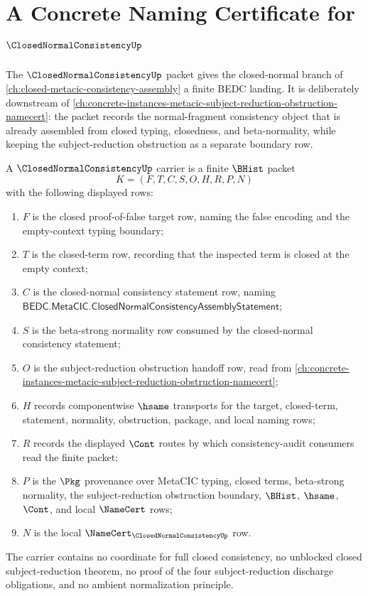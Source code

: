 \chapter{A Concrete Naming Certificate for $\ClosedNormalConsistencyUp$}
\label{ch:concrete-instances-closed-normal-consistency-namecert}

The $\ClosedNormalConsistencyUp$ packet gives the closed-normal branch of
\autoref{ch:closed-metacic-consistency-assembly} a finite BEDC landing.
It is deliberately downstream of
\autoref{ch:concrete-instances-metacic-subject-reduction-obstruction-namecert}:
the packet records the normal-fragment consistency object that is already
assembled from closed typing, closedness, and beta-normality, while keeping the
subject-reduction obstruction as a separate boundary row.

\begin{definition}
\label{def:closed-normal-consistency-carrier}
A $\ClosedNormalConsistencyUp$ carrier is a finite $\BHist$ packet
$$
K=(F,T,C,S,O,H,R,P,N)
$$
with the following displayed rows:
\begin{enumerate}
\item $F$ is the closed proof-of-false target row, naming the false encoding and
the empty-context typing boundary;
\item $T$ is the closed-term row, recording that the inspected term is closed at
the empty context;
\item $C$ is the closed-normal consistency statement row, naming
$\mathsf{BEDC.MetaCIC.ClosedNormalConsistencyAssemblyStatement}$;
\item $S$ is the beta-strong normality row consumed by the closed-normal
consistency statement;
\item $O$ is the subject-reduction obstruction handoff row, read from
\autoref{ch:concrete-instances-metacic-subject-reduction-obstruction-namecert};
\item $H$ records componentwise $\hsame$ transports for the target, closed-term,
statement, normality, obstruction, package, and local naming rows;
\item $R$ records the displayed $\Cont$ routes by which consistency-audit
consumers read the finite packet;
\item $P$ is the $\Pkg$ provenance over MetaCIC typing, closed terms,
beta-strong normality, the subject-reduction obstruction boundary, $\BHist$,
$\hsame$, $\Cont$, and local $\NameCert$ rows;
\item $N$ is the local $\NameCert_{\ClosedNormalConsistencyUp}$ row.
\end{enumerate}
The carrier contains no coordinate for full closed consistency, no unblocked
closed subject-reduction theorem, no proof of the four subject-reduction
discharge obligations, and no ambient normalization principle.
\end{definition}

